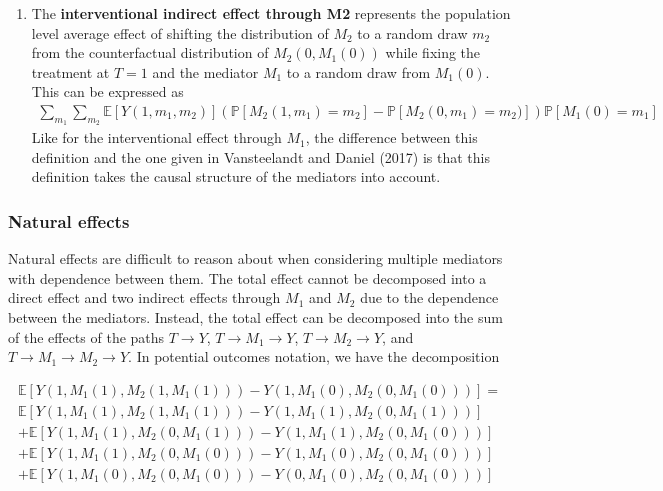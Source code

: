 \documentclass[12pt]{article} %
\numberwithin{equation}{section} %
\begin{document}
\begin{enumerate}
    \item The \textbf{interventional indirect effect through M2} represents the population level average effect of shifting the distribution of $M_{2}$ to a random draw $m_{2}$ from the counterfactual distribution of $M_{2}(0,M_{1}(0))$ while fixing the treatment at $T=1$ and the mediator $M_{1}$ to a random draw from $M_{1}(0)$. This can be expressed as
    \begin{align*}
     \sum_{m_{1}} \sum_{m_{2}} \mathbb{E}[Y(1,m_{1},m_{2})](\mathbb{P}[M_{2}(1,m_{1}) = m_{2}] -
     \mathbb{P}[M_{2}(0,m_{1})=m_{2})])\mathbb{P}[M_{1}(0)=m_{1}]
    \end{align*}
    Like for the interventional effect through $M_{1}$, the difference between this definition and the one given in Vansteelandt and Daniel (2017) is that this definition takes the causal structure of the mediators into account.
\end{enumerate}

\subsubsection{Natural effects}

Natural effects are difficult to reason about when considering multiple mediators with dependence between them. The total effect cannot be decomposed into a direct effect and two indirect effects through $M_{1}$ and $M_{2}$ due to the dependence between the mediators. Instead, the total effect can be decomposed into the sum of the effects of the paths $T \rightarrow Y$, $T \rightarrow M_{1} \rightarrow Y$, $T \rightarrow M_{2} \rightarrow Y$, and $T \rightarrow M_{1} \rightarrow M_{2} \rightarrow Y$. In potential outcomes notation, we have the decomposition 

\begin{align*}
    \mathbb{E}[Y(1,M_{1}(1),M_{2}(1,M_{1}(1))) - Y(1,M_{1}(0),M_{2}(0,M_{1}(0)))] = \\
    \mathbb{E}[Y(1,M_{1}(1),M_{2}(1,M_{1}(1))) - Y(1,M_{1}(1),M_{2}(0,M_{1}(1)))] \\
    + \mathbb{E}[Y(1,M_{1}(1),M_{2}(0,M_{1}(1))) - Y(1,M_{1}(1),M_{2}(0,M_{1}(0)))] \\
    + \mathbb{E}[Y(1,M_{1}(1),M_{2}(0,M_{1}(0))) - Y(1,M_{1}(0),M_{2}(0,M_{1}(0)))] \\
    + \mathbb{E}[Y(1,M_{1}(0),M_{2}(0,M_{1}(0))) - Y(0,M_{1}(0),M_{2}(0,M_{1}(0)))]
\end{align*}
\end{document}
